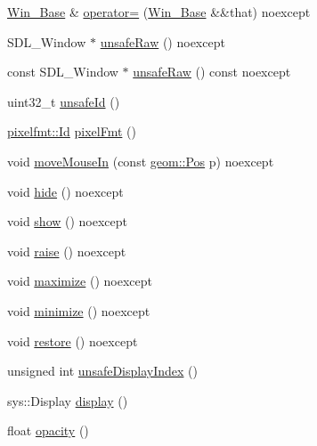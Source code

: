 \begin{DoxyCompactItemize}
\item 
\mbox{\hyperlink{classrolmodl_1_1_win___base}{Win\+\_\+\+Base}} \& \mbox{\hyperlink{classrolmodl_1_1_win___base_afc3b760d207102432bc4ad001b330f0c}{operator=}} (\mbox{\hyperlink{classrolmodl_1_1_win___base}{Win\+\_\+\+Base}} \&\&that) noexcept
\item 
S\+D\+L\+\_\+\+Window $\ast$ \mbox{\hyperlink{classrolmodl_1_1_win___base_a7a93f6c843993690471642a5350f625b}{unsafe\+Raw}} () noexcept
\item 
const S\+D\+L\+\_\+\+Window $\ast$ \mbox{\hyperlink{classrolmodl_1_1_win___base_ac74ad951ad66254d4d292039559f0d06}{unsafe\+Raw}} () const noexcept
\item 
uint32\+\_\+t \mbox{\hyperlink{classrolmodl_1_1_win___base_a0efef417d9cc3d838a84c70a8179d5b6}{unsafe\+Id}} ()
\item 
\mbox{\hyperlink{namespacerolmodl_1_1pixelfmt_a96282713e4465ba9211c8fd3a702b52b}{pixelfmt\+::\+Id}} \mbox{\hyperlink{classrolmodl_1_1_win___base_aad46307c1ad78308c4e1befde166682e}{pixel\+Fmt}} ()
\item 
void \mbox{\hyperlink{classrolmodl_1_1_win___base_a78a1ebd530b3a7a54eb355e77df2377f}{move\+Mouse\+In}} (const \mbox{\hyperlink{structrolmodl_1_1geom_1_1_pos}{geom\+::\+Pos}} p) noexcept
\item 
void \mbox{\hyperlink{classrolmodl_1_1_win___base_a65c3f53e955261a2d7a864e9295b2375}{hide}} () noexcept
\item 
void \mbox{\hyperlink{classrolmodl_1_1_win___base_a5592cfca6b80670f2a3517cc77852b8f}{show}} () noexcept
\item 
void \mbox{\hyperlink{classrolmodl_1_1_win___base_aecd20d7aa4e49e52052c2db0ecde2dd8}{raise}} () noexcept
\item 
void \mbox{\hyperlink{classrolmodl_1_1_win___base_a03bf213c7451e5c16fd903a9f498a46d}{maximize}} () noexcept
\item 
void \mbox{\hyperlink{classrolmodl_1_1_win___base_ac7fa1c8c4dd67b4fb5a14f80aeb494d7}{minimize}} () noexcept
\item 
void \mbox{\hyperlink{classrolmodl_1_1_win___base_aabff037e2c27e271b09ea16a1886e810}{restore}} () noexcept
\item 
unsigned int \mbox{\hyperlink{classrolmodl_1_1_win___base_ac58ea3d9b32a0ead9aad7bfc380b0619}{unsafe\+Display\+Index}} ()
\item 
sys\+::\+Display \mbox{\hyperlink{classrolmodl_1_1_win___base_ad93474759ca3be7601135a7159b6c533}{display}} ()
\item 
float \mbox{\hyperlink{classrolmodl_1_1_win___base_a8e3fc6d2a7ea0a102be3b097c0b171af}{opacity}} ()

\end{DoxyCompactItemize}
